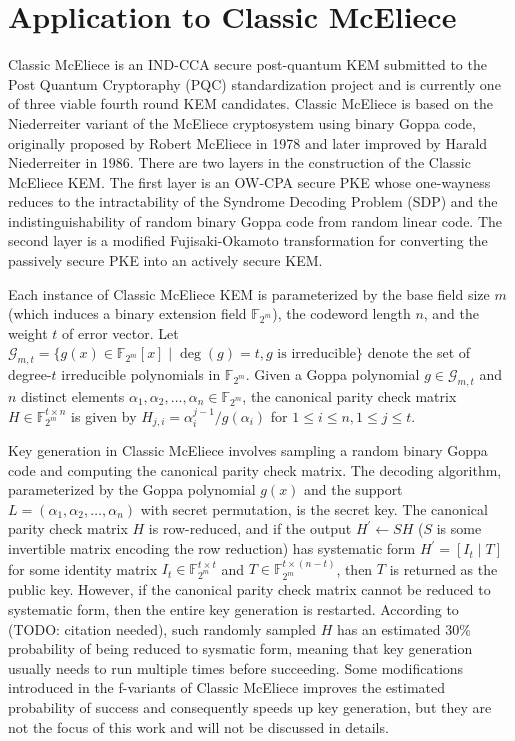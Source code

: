 \documentclass[runningheads]{llncs}
\begin{document}
\section{Application to Classic McEliece}\label{sec:application-to-classic-mceliece}
Classic McEliece is an IND-CCA secure post-quantum KEM submitted to the Post Quantum Cryptoraphy (PQC) standardization project and is currently one of three viable fourth round KEM candidates. Classic McEliece is based on the Niederreiter variant of the McEliece cryptosystem using binary Goppa code, originally proposed by Robert McEliece in 1978 and later improved by Harald Niederreiter in 1986. There are two layers in the construction of the Classic McEliece KEM. The first layer is an OW-CPA secure PKE whose one-wayness reduces to the intractability of the Syndrome Decoding Problem (SDP) and the indistinguishability of random binary Goppa code from random linear code. The second layer is a modified Fujisaki-Okamoto transformation for converting the passively secure PKE into an actively secure KEM.

Each instance of Classic McEliece KEM is parameterized by the base field size $m$ (which induces a binary extension field $\mathbb{F}_{2^m}$), the codeword length $n$, and the weight $t$ of error vector. Let $\mathcal{G}_{m, t} = \{g(x) \in \mathbb{F}_{2^m}[x] \mid \deg(g) = t, \text{$g$ is irreducible}\}$ denote the set of degree-$t$ irreducible polynomials in $\mathbb{F}_{2^m}$. Given a Goppa polynomial $g \in \mathcal{G}_{m, t}$ and $n$ distinct elements $\alpha_1, \alpha_2, \ldots, \alpha_n \in \mathbb{F}_{2^m}$, the canonical parity check matrix $H \in \mathbb{F}_{2^m}^{t \times n}$ is given by $H_{j,i} = \alpha_i^{j-1}/g(\alpha_i)$ for $1\leq i \leq n, 1 \leq j \leq t$.

Key generation in Classic McEliece involves sampling a random binary Goppa code and computing the canonical parity check matrix. The decoding algorithm, parameterized by the Goppa polynomial $g(x)$ and the support $L = (\alpha_1, \alpha_2, \ldots, \alpha_n)$ with secret permutation, is the secret key. The canonical parity check matrix $H$ is row-reduced, and if the output $H^\prime \leftarrow SH$ ($S$ is some invertible matrix encoding the row reduction) has systematic form $H^\prime = [I_t \mid T]$ for some identity matrix $I_t \in \mathbb{F}_{2^m}^{t \times t}$ and $T \in \mathbb{F}_{2^m}^{t \times (n - t)}$, then $T$ is returned as the public key. However, if the canonical parity check matrix cannot be reduced to systematic form, then the entire key generation is restarted. According to (TODO: citation needed), such randomly sampled $H$ has an estimated 30\% probability of being reduced to sysmatic form, meaning that key generation usually needs to run multiple times before succeeding. Some modifications introduced in the f-variants of Classic McEliece improves the estimated probability of success and consequently speeds up key generation, but they are not the focus of this work and will not be discussed in details.
\end{document}
